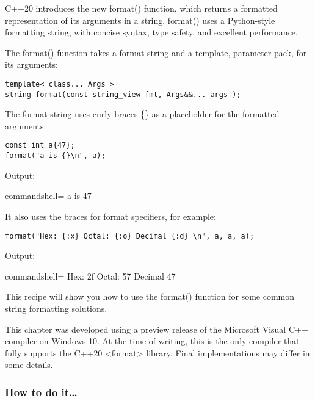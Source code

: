 
C++20 introduces the new format() function, which returns a formatted representation of its arguments in a string. format() uses a Python-style formatting string, with concise syntax, type safety, and excellent performance.

The format() function takes a format string and a template, parameter pack, for its arguments:

\begin{lstlisting}[style=styleCXX]
template< class... Args >
string format(const string_view fmt, Args&&... args );
\end{lstlisting}

The format string uses curly braces \{\} as a placeholder for the formatted arguments:

\begin{lstlisting}[style=styleCXX]
const int a{47};
format("a is {}\n", a);
\end{lstlisting}

Output:

\begin{tcblisting}{commandshell={}}
a is 47
\end{tcblisting}

It also uses the braces for format specifiers, for example:

\begin{lstlisting}[style=styleCXX]
	format("Hex: {:x} Octal: {:o} Decimal {:d} \n", a, a, a);
\end{lstlisting}

Output:

\begin{tcblisting}{commandshell={}}
Hex: 2f Octal: 57 Decimal 47
\end{tcblisting}

This recipe will show you how to use the format() function for some common string formatting solutions.

\begin{tcolorbox}[colback=webgreen!5!white,colframe=webgreen!75!black,title=Note]
This chapter was developed using a preview release of the Microsoft Visual C++ compiler on Windows 10. At the time of writing, this is the only compiler that fully supports the C++20 <format> library. Final implementations may differ in some details.
\end{tcolorbox}

\subsubsection{How to do it…}

